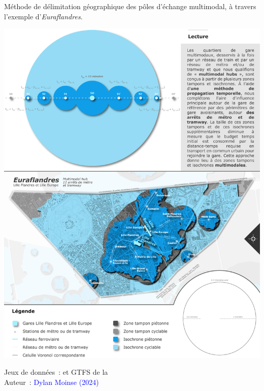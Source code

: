 \begin{refsegment}
    \begin{carte}[h!]\vspace*{4pt}
        \caption{Méthode de délimitation géographique des pôles d'échange multimodal, à travers l'exemple d'\textsl{Euraflandres}.}
        \label{fig-chap3:carte-calcul-multimodal-hubs-euraflandres}
        \centerline{\includegraphics[width=1\columnwidth]{src/Figures/Chap-3/FR_Carte_Euraflandres.png}}
        \vspace{5pt}
        \begin{flushright}\scriptsize{
        Jeux de données~: \textcolor{blue}{\textcite{openstreetmap_openstreetmap_2023}} et \acrshort{GTFS} de la \textcolor{blue}{\textcite{sncf_reseau_2024}}
        \\
        Auteur~: \textcolor{blue}{Dylan Moinse (2024)}
        }\end{flushright}
    \end{carte}


\end{refsegment}
